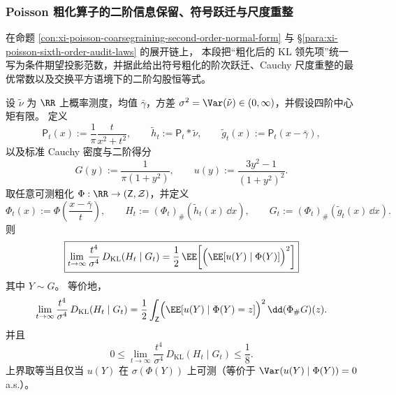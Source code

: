 \subsubsection{Poisson 粗化算子的二阶信息保留、符号跃迁与尺度重整}\label{subsubsec:xi-poisson-coarsegraining-operator-projection-laws}
在命题 \ref{con:xi-poisson-coarsegraining-second-order-normal-form} 与
\S\ref{para:xi-poisson-sixth-order-audit-laws} 的展开链上，
本段把“粗化后的 KL 领先项”统一写为条件期望投影范数，并据此给出符号粗化的阶次跃迁、Cauchy 尺度重整的最优常数以及交换平方语境下的二阶勾股恒等式。

\begin{theorem}[任意粗化算子下的二阶信息保留定律]\label{thm:xi-poisson-kl-coarsegraining-projection-coefficient}
设 \(\tilde\nu\) 为 \(\RR\) 上概率测度，均值 \(\bar\gamma\)，方差
\(
\sigma^2=\Var(\tilde\nu)\in(0,\infty)
\)，并假设四阶中心矩有限。
定义
\[
\mathsf P_t(x):=\frac{1}{\pi}\frac{t}{x^2+t^2},\qquad
\tilde h_t:=\mathsf P_t*\tilde\nu,\qquad
\tilde g_t(x):=\mathsf P_t(x-\bar\gamma),
\]
以及标准 Cauchy 密度与二阶得分
\[
G(y):=\frac{1}{\pi(1+y^2)},\qquad
u(y):=\frac{3y^2-1}{(1+y^2)^2}.
\]
取任意可测粗化 \(\Phi:\RR\to(\mathsf Z,\mathcal Z)\)，并定义
\[
\Phi_t(x):=\Phi\!\left(\frac{x-\bar\gamma}{t}\right),\qquad
H_t:=(\Phi_t)_{\#}(\tilde h_t(x)\,\dd x),\qquad
G_t:=(\Phi_t)_{\#}(\tilde g_t(x)\,\dd x).
\]
则
\begin{equation}\label{eq:xi-poisson-kl-coarsegraining-projection-limit}
\boxed{
\lim_{t\to\infty}\frac{t^4}{\sigma^4}\,D_{\mathrm{KL}}(H_t\mid G_t)
=\frac12\,\EE\!\left[\Bigl(\EE[u(Y)\mid \Phi(Y)]\Bigr)^2\right]
}
\end{equation}
其中 \(Y\sim G\)。
等价地，
\[
\lim_{t\to\infty}\frac{t^4}{\sigma^4}\,D_{\mathrm{KL}}(H_t\mid G_t)
=\frac12\int_{\mathsf Z}\Bigl(\EE[u(Y)\mid \Phi(Y)=z]\Bigr)^2\,\dd(\Phi_{\#}G)(z).
\]
并且
\begin{equation}\label{eq:xi-poisson-kl-coarsegraining-projection-bounds}
0\le
\lim_{t\to\infty}\frac{t^4}{\sigma^4}\,D_{\mathrm{KL}}(H_t\mid G_t)
\le \frac18.
\end{equation}
上界取等当且仅当 \(u(Y)\) 在 \(\sigma(\Phi(Y))\) 上可测（等价于
\(\Var(u(Y)\mid \Phi(Y))=0\) a.s.）。
\end{theorem}


